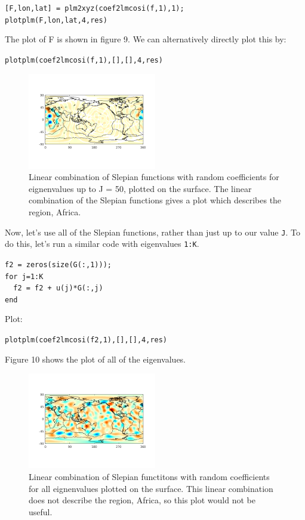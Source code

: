 \documentclass[11pt]{article}
\begin{document}
\verb|[F,lon,lat] = plm2xyz(coef2lmcosi(f,1),1);|\\
\verb|plotplm(F,lon,lat,4,res)|

The plot of F is shown in figure 9.  We can alternatively directly plot this by:

\verb|plotplm(coef2lmcosi(f,1),[],[],4,res)|

\begin{figure}[H]
	\centering
	\includegraphics[width=0.5\textwidth]{figures/F_ml.png}
	\caption{Linear combination of Slepian functions with random coefficients for eignenvalues up to J = 50, plotted on the surface.  The linear combination of the Slepian functions gives a plot which describes the region, Africa.}
\end{figure}


Now, let's use all of the Slepian functions, rather than just up to our value \verb|J|.  To do this, let's run a similar code with eigenvalues \verb|1:K|.

\verb|f2 = zeros(size(G(:,1)));|\\
\verb|for j=1:K|\\
\verb|	f2 = f2 + u(j)*G(:,j)|\\
\verb|end|

Plot:

\verb|plotplm(coef2lmcosi(f2,1),[],[],4,res)|

Figure 10 shows the plot of all of the eigenvalues.

\begin{figure}[H]
	\centering
	\includegraphics[width=0.5\textwidth]{figures/f2ml.png}
	\caption{Linear combination of Slepian functitons with random coefficients for all eignenvalues plotted on the surface.  This linear combination does not describe the region, Africa, so this plot would not be useful.}
\end{figure}
\end{document}
